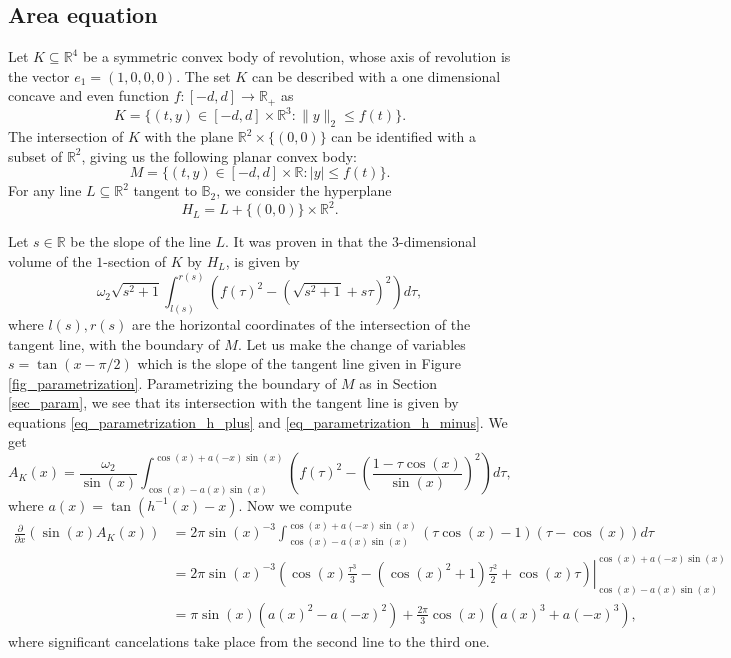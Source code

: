\documentclass{amsart}
\def \R{\mathbb R}
\def \B{\mathbb B}
\begin{document}
\subsection{Area equation}
\label{sec_equation}

Let $K \subseteq \R^4$ be a symmetric convex body of revolution, whose axis of revolution is the vector $e_1 = (1,0,0,0)$.
The set $K$ can be described with a one dimensional concave and even function $f:[-d,d] \to \R_+$ as 
\[K = \{(t,y) \in [-d,d] \times \R^3 : \|y\|_2 \leq f(t) \}.\]
The intersection of $K$ with the plane $\R^2 \times \{(0,0)\}$ can be identified with a subset of $\R^2$, giving us the following planar convex body:
\[M = \{(t,y) \in [-d,d] \times \R : |y| \leq f(t) \}.\]
For any line $L \subseteq \R^2$ tangent to $\B_2$, we consider the hyperplane
\[
	H_L = L + \{(0,0)\} \times \R^2.
\]

Let $s \in \R$ be the slope of the line $L$. It was proven in \cite[Lemma 4.2]{alfonseca2025croft} that the $3$-dimensional volume of the $1$-section of $K$ by $H_L$, is given by
\[
	\omega_2 \sqrt{s^2+1} \int_{l(s)}^{r(s)} \left(f(\tau)^2-(\sqrt{s^2+1}+s \tau)^2\right) d\tau,
\]
where $l(s),r(s)$ are the horizontal coordinates of the intersection of the tangent line, with the boundary of $M$.
Let us make the change of variables $s = \tan(x-\pi/2)$ which is the slope of the tangent line given in Figure \ref{fig_parametrization}.
Parametrizing the boundary of $M$ as in Section \ref{sec_param}, we see that its intersection with the tangent line is given by equations \eqref{eq_parametrization_h_plus} and \eqref{eq_parametrization_h_minus}.
We get
\begin{equation}
	\label{eq_area_x}
	A_K(x) = \frac{\omega_2}{\sin(x)} \int_{\cos(x)-a(x) \sin(x)}^{\cos(x) + a(-x) \sin(x)} \left(f(\tau)^2-\left( \frac{1-\tau \cos(x)}{\sin(x)} \right)^2 \right) d\tau,
\end{equation}
where $a(x) = \tan(h^{-1}(x) - x)$. Now we compute
\begin{align}
	\frac{\partial}{\partial x} (\sin(x) A_K(x)) 
	&= 2\pi \sin(x)^{-3} \int_{\cos(x) - a(x) \sin(x)}^{\cos(x) + a(-x) \sin(x)} (\tau \cos(x)-1)(\tau-\cos(x)) d\tau \\
	&= 2\pi \sin(x)^{-3} \left.\left( \cos(x) \frac {\tau^3}3 - (\cos(x)^2+1) \frac{\tau^2}2 +\cos(x) \tau \right) \right|_{\cos(x) - a(x) \sin(x)}^{\cos(x) + a(-x) \sin(x)} \\
	\label{eq_darea_x} &= \pi \sin(x) ( a(x)^2 - a(-x)^2 ) + \frac {2\pi}3 \cos(x) (a(x)^3 + a(-x)^3),
\end{align}
where significant cancelations take place from the second line to the third one.
\end{document}
